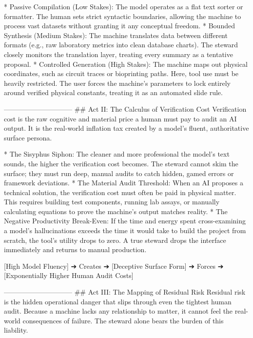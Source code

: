 * Passive Compilation (Low Stakes): The model operates as a flat text sorter or formatter. The human sets strict syntactic boundaries, allowing the machine to process vast datasets without granting it any conceptual freedom.
* Bounded Synthesis (Medium Stakes): The machine translates data between different formats (e.g., raw laboratory metrics into clean database charts). The steward closely monitors the translation layer, treating every summary as a tentative proposal.
* Controlled Generation (High Stakes): The machine maps out physical coordinates, such as circuit traces or bioprinting paths. Here, tool use must be heavily restricted. The user forces the machine's parameters to lock entirely around verified physical constants, treating it as an automated slide rule.

------------------------------
## Act II: The Calculus of Verification Cost
Verification cost is the raw cognitive and material price a human must pay to audit an AI output. It is the real-world inflation tax created by a model's fluent, authoritative surface persona.

* The Sisyphus Siphon: The cleaner and more professional the model's text sounds, the higher the verification cost becomes. The steward cannot skim the surface; they must run deep, manual audits to catch hidden, gamed errors or framework deviations.
* The Material Audit Threshold: When an AI proposes a technical solution, the verification cost must often be paid in physical matter. This requires building test components, running lab assays, or manually calculating equations to prove the machine's output matches reality.
* The Negative Productivity Break-Even: If the time and energy spent cross-examining a model's hallucinations exceeds the time it would take to build the project from scratch, the tool's utility drops to zero. A true steward drops the interface immediately and returns to manual production.

[High Model Fluency] ➔ Creates ➔ [Deceptive Surface Form] ➔ Forces ➔ [Exponentially Higher Human Audit Costs]

------------------------------
## Act III: The Mapping of Residual Risk
Residual risk is the hidden operational danger that slips through even the tightest human audit. Because a machine lacks any relationship to matter, it cannot feel the real-world consequences of failure. The steward alone bears the burden of this liability.

